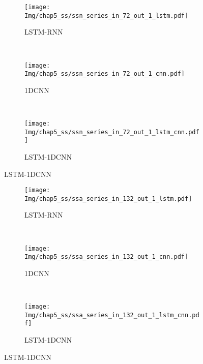 \begin{figure}[!htbp]
  \centering
  \begin{subfigure}[b]{1.0\textwidth}
    \caption{LSTM-RNN} 
    \vspace{-0.35cm}
    \texttt{[image: Img/chap5\_ss/ssn\_series\_in\_72\_out\_1\_lstm.pdf]}
    \label{fig:ssn_series_in_72_out_1_lstm}
  \end{subfigure}    \\
  \vspace{-1cm}
  \begin{subfigure}[b]{1.0\textwidth}
    \caption{1DCNN}
    \vspace{-0.35cm}
    \texttt{[image: Img/chap5\_ss/ssn\_series\_in\_72\_out\_1\_cnn.pdf]}
    \label{fig:ssn_series_in_72_out_1_cnn}
  \end{subfigure} \\
  \vspace{-1cm}
  \begin{subfigure}[b]{1.0\textwidth}
    \caption{LSTM-1DCNN}
    \vspace{-0.35cm}
    \texttt{[image: Img/chap5\_ss/ssn\_series\_in\_72\_out\_1\_lstm\_cnn.pdf]}
    \label{fig:ssn_series_in_72_out_1_lstm_cnn}
    \end{subfigure}
  \vspace{-2cm}
  \label{fig:ssn_series_in_72_out_1}
\end{figure}

\begin{figure}[!htbp]
  \centering
  \begin{subfigure}[b]{1.0\textwidth}
    \caption{LSTM-RNN} 
    \vspace{-0.35cm}
    \texttt{[image: Img/chap5\_ss/ssa\_series\_in\_132\_out\_1\_lstm.pdf]}
    \label{fig:ssa_series_in_132_out_1_lstm}
  \end{subfigure}    \\
  \vspace{-1cm}
  \begin{subfigure}[b]{1.0\textwidth}
    \caption{1DCNN}
    \vspace{-0.35cm}
    \texttt{[image: Img/chap5\_ss/ssa\_series\_in\_132\_out\_1\_cnn.pdf]}
    \label{fig:ssa_series_in_132_out_1_cnn}
  \end{subfigure} \\
  \vspace{-1cm}
  \begin{subfigure}[b]{1.0\textwidth}
    \caption{LSTM-1DCNN}
    \vspace{-0.35cm}
    \texttt{[image: Img/chap5\_ss/ssa\_series\_in\_132\_out\_1\_lstm\_cnn.pdf]}
    \label{fig:ssa_series_in_132_out_1_lstm_cnn}
    \end{subfigure}
  \vspace{-2cm}
  \label{fig:ssa_series_in_132_out_1}
\end{figure}

